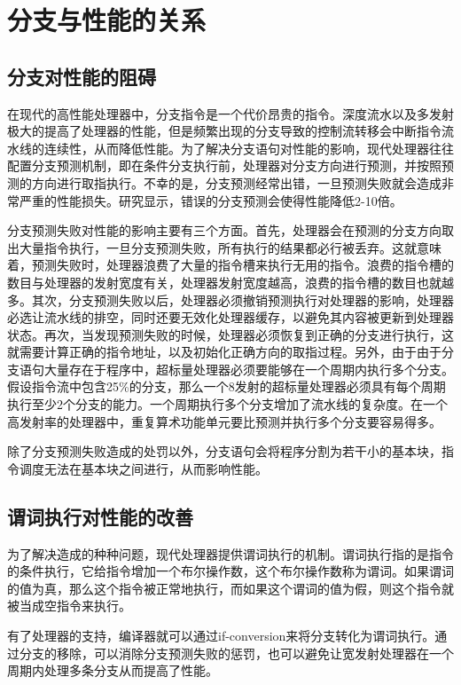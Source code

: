 \section{分支与性能的关系}

\subsection{分支对性能的阻碍}

在现代的高性能处理器中，分支指令是一个代价昂贵的指令\cite{Mahlke1994}。深度流水以及多发射极大的提高了处理器的性能，但是频繁出现的分支导致的控制流转移会中断指令流水线的连续性，从而降低性能。为了解决分支语句对性能的影响，现代处理器往往配置分支预测机制，即在条件分支执行前，处理器对分支方向进行预测，并按照预测的方向进行取指执行。不幸的是，分支预测经常出错，一旦预测失败就会造成非常严重的性能损失。研究显示，错误的分支预测会使得性能降低2-10倍\cite{Smith1989}\cite{Wall1991}\cite{1991}。

分支预测失败对性能的影响主要有三个方面。首先，处理器会在预测的分支方向取出大量指令执行，一旦分支预测失败，所有执行的结果都必行被丢弃。这就意味着，预测失败时，处理器浪费了大量的指令槽来执行无用的指令。浪费的指令槽的数目与处理器的发射宽度有关，处理器发射宽度越高，浪费的指令槽的数目也就越多。其次，分支预测失败以后，处理器必须撤销预测执行对处理器的影响，处理器必选让流水线的排空，同时还要无效化处理器缓存，以避免其内容被更新到处理器状态。再次，当发现预测失败的时候，处理器必须恢复到正确的分支进行执行，这就需要计算正确的指令地址，以及初始化正确方向的取指过程。另外，由于由于分支语句大量存在于程序中，超标量处理器必须要能够在一个周期内执行多个分支。假设指令流中包含25\%的分支，那么一个8发射的超标量处理器必须具有每个周期执行至少2个分支的能力。一个周期执行多个分支增加了流水线的复杂度。在一个高发射率的处理器中，重复算术功能单元要比预测并执行多个分支要容易得多。

除了分支预测失败造成的处罚以外，分支语句会将程序分割为若干小的基本块，指令调度无法在基本块之间进行，从而影响性能。


\subsection{谓词执行对性能的改善}

为了解决造成的种种问题，现代处理器提供谓词执行的机制。谓词执行指的是指令的条件执行，它给指令增加一个布尔操作数，这个布尔操作数称为谓词。如果谓词的值为真，那么这个指令被正常地执行，而如果这个谓词的值为假，则这个指令就被当成空指令来执行。

有了处理器的支持，编译器就可以通过if-conversion来将分支转化为谓词执行。通过分支的移除，可以消除分支预测失败的惩罚，也可以避免让宽发射处理器在一个周期内处理多条分支从而提高了性能。

